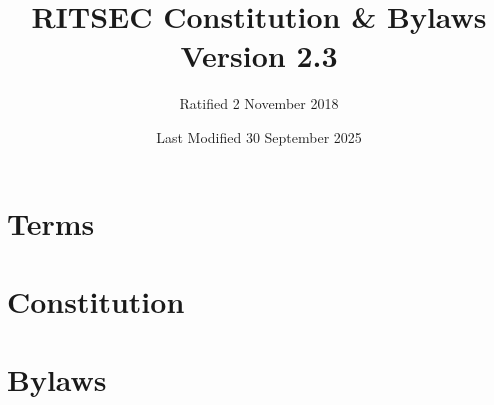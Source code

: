 \documentclass{constitution}
\title{RITSEC Constitution \& Bylaws\\ Version 2.3}
\author{Ratified 2 November 2018}
\date{Last Modified 30 September 2025}
\begin{document}
\maketitle
\newpage

\part{Terms}



\newpage

\part{Constitution}












\newpage


\part{Bylaws}







\end{document}
